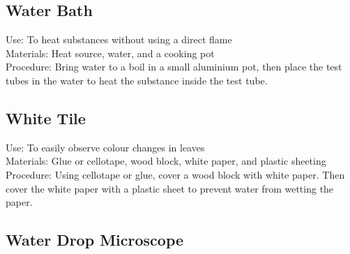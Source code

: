 \subsection*{Water Bath}


Use: To heat substances without using a direct flame\\
Materials: Heat source, water, and a cooking pot\\
Procedure: Bring water to a boil in a small aluminium pot, then place the test tubes in the water to heat the substance inside the test tube.\\


\subsection*{White Tile}


Use: To easily observe colour changes in leaves\\
Materials: Glue or cellotape, wood block, white paper, and plastic sheeting\\
Procedure: Using cellotape or glue, cover a wood block with white paper. Then cover the white paper with a plastic sheet to prevent water from wetting the paper.


\subsection*{Water Drop Microscope}


